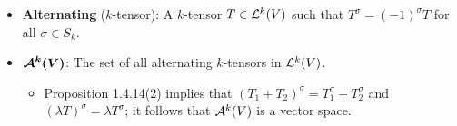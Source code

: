 \documentclass[../notes.tex]{subfiles}
\begin{document}
\begin{itemize}
\begin{enumerate}
\begin{proof}
        \end{proof}
        \item The assignment $T\mapsto T^\sigma$ is a linear map from $\lin[k]{V}\to\lin[k]{V}$.
        \begin{proof}
            See Exercise 1.4.iii.
        \end{proof}
        \item If $\sigma_1,\sigma_2\in S_k$, we have $T^{\sigma_1\sigma_2}=(T^{\sigma_1})^{\sigma_2}$.
        \begin{proof}
            Let $T=\ell_1\otimes\cdots\otimes\ell_k$\footnote{What gives us the right to assume $T$ is decomposable?}. Then
            \begin{equation*}
                T^{\sigma_1} = \ell_{\sigma_1(1)}\otimes\cdots\otimes\ell_{\sigma_1(k)}
                = \ell_1'\otimes\cdots\otimes\ell_k'
            \end{equation*}
            and thus
            \begin{equation*}
                (T^{\sigma_1})^{\sigma_2} = \ell_{\sigma_2(1)}'\otimes\cdots\otimes\ell_{\sigma_2(k)}'
            \end{equation*}
            Let $\sigma_2(i)=j$. Then since $\ell_p'=\ell_{\sigma_1(p)}$ by definition, we have that $\ell_{\sigma_2(j)}'=\ell_{\sigma_1(\sigma_2(j))}$. Therefore,
            \begin{align*}
                (T^{\sigma_1})^{\sigma_2} &= \ell_{\sigma_2(1)}'\otimes\cdots\otimes\ell_{\sigma_2(k)}'\\
                &= \ell_{\sigma_1(\sigma_2(1))}\otimes\cdots\otimes\ell_{\sigma_1(\sigma_2(k))}\\
                &= \ell_{\sigma_1\sigma_2(1)}\otimes\cdots\otimes\ell_{\sigma_1\sigma_2(k)}\\
                &= T^{\sigma_1\sigma_2}
            \end{align*}
            as desired.
        \end{proof}
    \end{enumerate}
    \item \textbf{Alternating} ($k$-tensor): A $k$-tensor $T\in\lin[k]{V}$ such that $T^\sigma=(-1)^\sigma T$ for all $\sigma\in S_k$.
    \item $\bm{\alt[k]{V}}$: The set of all alternating $k$-tensors in $\lin[k]{V}$.
    \begin{itemize}
        \item Proposition 1.4.14(2) implies that $(T_1+T_2)^\sigma=T_1^\sigma+T_2^\sigma$ and $(\lambda T)^\sigma=\lambda T^\sigma$; it follows that $\alt[k]{V}$ is a vector space.

\end{itemize}
\end{itemize}
\end{document}
